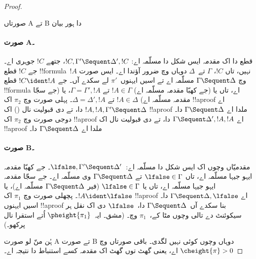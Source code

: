 \documentclass[../../../include/open-logic-section]{subfiles}
\begin{document}
\begin{proof}
\begin{center}
صورتاں A تے B دا ہور بیان
\end{center}

\paragraph{صورت A۔} قطع دا اک مقدمہ ایس شکل دا مسلّمہ اے: $!C, \Gamma' \Sequent \Delta', !C$، جتھے $!C$ جوہری اے۔ جے $!C$ قطع !!{formula}~$!A$ نہیں، تاں $!C$، $\Gamma$ تے~$\Delta$ دوہاں وچ ضرور آؤندا اے۔ ایس صورت وچ $\Gamma \Sequent \Delta$ مسلّمہ اے تے اسیں ایہنوں~$\pi'$ لے سکدے آں۔ جے $!C \ident !A$ قطع !!{formula} اے، تاں یا (جے کھبّا مقدمہ مسلّمہ اے) $!A \in \Gamma$ تے $\Gamma = \Gamma', !A$، یا (جے سجّا مقدمہ مسلّمہ اے) $!A \in
\Delta$ تے $\Delta = \Delta', !A$۔ پہلی صورت وچ $\pi_2$ اک !!a{proof} اے $!A, !A, \Gamma' \Sequent \Delta$ دا، تے \LeftR{\Contraction} دی قبولیت نال () اک !!a{proof} ملدا اے $\Gamma \Sequent \Delta$ دا۔ دوجی صورت وچ $\pi_2$ اک !!a{proof} اے $\Gamma \Sequent \Delta', !A, !A$ دا، تے \RightR{\Contraction} دی قبولیت نال اک !!a{proof} ملدا اے $\Gamma \Sequent
\Delta$ دا۔

\paragraph{صورت B۔} مقدمیّاں وچوں اک ایس شکل دا مسلّمہ اے:~$\lfalse, \Gamma' \Sequent \Delta'$۔ جے کھبّا مقدمہ ایہو جیہا مسلّمہ اے، تاں $\lfalse \in \Gamma$ تے $\Gamma \Sequent \Delta$ وی مسلّمہ اے۔ جے سجّا مقدمہ ایہو جیہا مسلّمہ اے، تاں یا $\lfalse \in \Gamma$ (فیر $\Gamma \Sequent \Delta$ مسلّمہ اے)، یا $!A \ident \lfalse$۔ پچھلی صورت وچ $\pi_1$ اک !!a{proof} اے $\Gamma \Sequent \Delta, \lfalse$ دا۔ اسیں ایہنوں !!a{proof} بنا سکدے آں~$\Gamma \Sequent \Delta$ دا،~$\lfalse$ دی اک نقل ہر سیکوئنٹ دے تالی وچوں مٹا کے،~$\pi_1$ وچ۔ (مشق۔ ایہ~$\pheight{\pi_1}$ اُتے استقرا نال پرکھو۔)

ہُن منّ لو صورت A تے صورت B دوہاں وچوں کوئی نہیں لگدی۔ باقی صورتاں وچ $\cheight{\pi} > 0$ اے، یعنی گھٹ توں گھٹ اک مقدمہ کسے استنباط دا نتیجہ اے۔


\end{proof}
\end{document}
